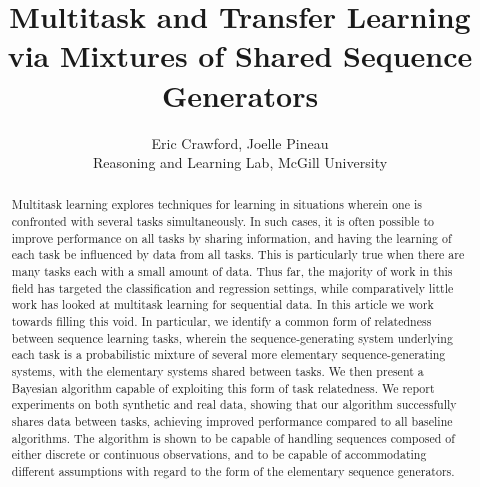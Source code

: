 \documentclass[letterpaper]{article}
\begin{document}
%
\title{Multitask and Transfer Learning via Mixtures of Shared Sequence Generators}
\author{Eric Crawford, Joelle Pineau\\
Reasoning and Learning Lab, McGill University\\
}
\maketitle
\begin{abstract}
    Multitask learning explores techniques for learning in situations wherein one is confronted with several tasks simultaneously. In such cases, it is often possible to improve performance on all tasks by sharing information, and having the learning of each task be influenced by data from all tasks. This is particularly true when there are many tasks each with a small amount of data. Thus far, the majority of work in this field has targeted the classification and regression settings, while comparatively little work has looked at multitask learning for sequential data. In this article we work towards filling this void. In particular, we identify a common form of relatedness between sequence learning tasks, wherein the sequence-generating system underlying each task is a probabilistic mixture of several more elementary sequence-generating systems, with the elementary systems shared between tasks. We then present a Bayesian algorithm capable of exploiting this form of task relatedness. We report experiments on both synthetic and real data, showing that our algorithm successfully shares data between tasks, achieving improved performance compared to all baseline algorithms. The algorithm is shown to be capable of handling sequences composed of either discrete or continuous observations, and to be capable of accommodating different assumptions with regard to the form of the elementary sequence generators.

\end{abstract}
\end{document}

